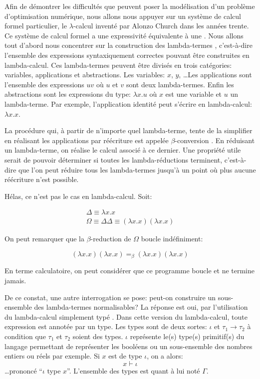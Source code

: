 Afin de démontrer les difficultés que peuvent poser la modélisation
d'un problème d'optimisation numérique, nous allons nous appuyer sur
un système de calcul formel particulier, le $\lambda$-calcul
 inventé par Alonzo Church 
dans les années trente. Ce système de calcul formel a une expressivité
équivalente à une . Nous allons tout d'abord
nous concentrer sur la construction des lambda-termes
, c'est-à-dire l'ensemble des expressions
syntaxiquement correctes pouvant être construites en lambda-calcul. Ces
lambda-termes peuvent être divisés en trois catégories: variables,
applications et abstractions. Les variables: $x$, $y$, \ldots Les
applications sont l'ensemble des expressions $u v$ où $u$ et $v$ sont
deux lambda-termes. Enfin les abstractions sont les expressions du
type: $\lambda x.u$ où $x$ est une variable et $u$ un
lambda-terme. Par exemple, l'application identité peut s'écrire en
lambda-calcul: $\lambda x.x$.


La procédure qui, à partir de n'importe quel lambda-terme, tente de la
simplifier en réalisant les applications par réécriture est appelée
$\beta$-conversion . En réduisant un
lambda-terme, on réalise le calcul associé à ce dernier. Une propriété
utile serait de pouvoir déterminer si toutes les lambda-réductions
terminent, c'est-à-dire que l'on peut réduire tous les lambda-termes
jusqu'à un point où plus aucune réécriture  n'est
possible.


Hélas, ce n'est pas le cas en lambda-calcul. Soit:

\begin{eqnarray}
  \Delta \equiv \lambda x.x\\
  \Omega \equiv \Delta \Delta \equiv (\lambda x.x) (\lambda x.x)
\end{eqnarray}

 On peut remarquer que la $\beta$-reduction de $\Omega$ boucle
 indéfiniment:

\begin{equation}
  (\lambda x.x) (\lambda x.x) =_{\beta} (\lambda x.x) (\lambda x.x)
\end{equation}

En terme calculatoire, on peut considérer que ce programme boucle et
ne termine jamais.


De ce constat, une autre interrogation se pose: peut-on construire un
sous-ensemble des lambda-termes normalisables? La réponse est oui, par
l'utilisation du lambda-calcul simplement typé . Dans cette version du lambda-calcul, toute
expression est annotée par un type. Les types sont de deux sortes:
$\iota$ et $\tau_1 \rightarrow \tau_2$ à condition que $\tau_1$ et
$\tau_2$ soient des types. $\iota$ représente le(s) type(s)
primitif(s) du langage permettant de représenter les booléens ou un
sous-ensemble des nombres entiers ou réels par exemple. Si $x$ est de
type $\iota$, on a alors:
%
\begin{equation}
  x \vdash \iota
\end{equation}
%
\ldots prononcé ``$\iota$ type $x$''. L'ensemble des types est quant à
lui noté $\Gamma$.


